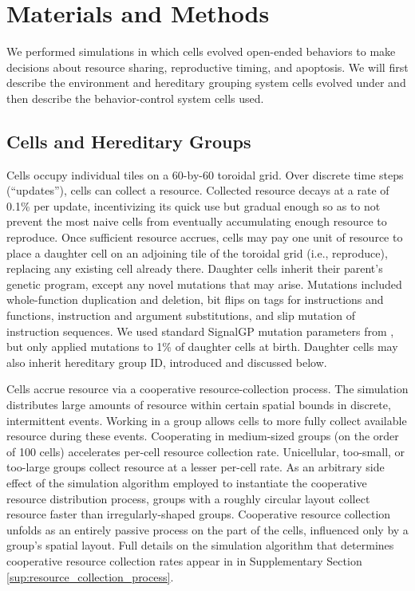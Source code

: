 \section{Materials and Methods}



We performed simulations in which cells evolved open-ended behaviors to make decisions about resource sharing, reproductive timing, and apoptosis.
We will first describe the environment and hereditary grouping system cells evolved under and then describe the behavior-control system cells used.

\subsection{Cells and Hereditary Groups}

Cells occupy individual tiles on a 60-by-60 toroidal grid.
Over discrete time steps (``updates''), cells can collect a resource.
Collected resource decays at a rate of 0.1\% per update, incentivizing its quick use but gradual enough so as to not prevent the most naive cells from eventually accumulating enough resource to reproduce.
Once sufficient resource accrues, cells may pay one unit of resource to place a daughter cell on an adjoining tile of the toroidal grid (i.e., reproduce), replacing any existing cell already there.
Daughter cells inherit their parent's genetic program, except any novel mutations that may arise.
Mutations included whole-function duplication and deletion, bit flips on tags for instructions and functions, instruction and argument substitutions, and slip mutation of instruction sequences.
We used standard SignalGP mutation parameters from \citep{lalejini2018evolving}, but only applied mutations to  1\% of daughter cells at birth.
Daughter cells may also inherit hereditary group ID, introduced and discussed below.

Cells accrue resource via a cooperative resource-collection process.
The simulation distributes large amounts of resource within certain spatial bounds in discrete, intermittent events.
Working in a group allows cells to more fully collect available resource during these events.
Cooperating in medium-sized groups (on the order of 100 cells) accelerates per-cell resource collection rate.
Unicellular, too-small, or too-large groups collect resource at a lesser per-cell rate.
As an arbitrary side effect of the simulation algorithm employed to instantiate the cooperative resource distribution process, groups with a roughly circular layout collect resource faster than irregularly-shaped groups.
Cooperative resource collection unfolds as an entirely passive process on the part of the cells, influenced only by a group's spatial layout.
Full details on the simulation algorithm that determines cooperative resource collection rates appear in in Supplementary Section \ref{sup:resource_collection_process}.

